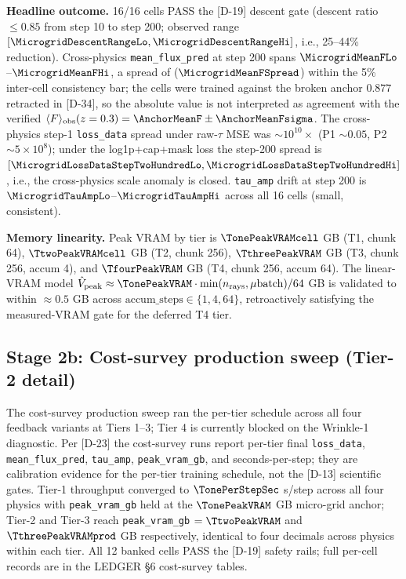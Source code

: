 \textbf{Headline outcome.} 16/16 cells PASS the [D-19] descent gate (descent ratio $\leq 0.85$ from step 10 to step 200; observed range $[\MicrogridDescentRangeLo, \MicrogridDescentRangeHi]$, i.e., 25--44\% reduction). Cross-physics \texttt{mean\_flux\_pred} at step 200 spans $\MicrogridMeanFLo$--$\MicrogridMeanFHi$, a spread of \textbf{\MicrogridMeanFSpreadAbs} ($\MicrogridMeanFSpread$) within the 5\% inter-cell consistency bar; the cells were trained against the broken anchor $0.877$ retracted in [D-34], so the absolute value is not interpreted as agreement with the verified $\langle F\rangle_{\text{obs}}(z=0.3) = \AnchorMeanF \pm \AnchorMeanFsigma$. The cross-physics step-1 \texttt{loss\_data} spread under raw-$\tau$ MSE was $\sim 10^{10} \times$ (P1 $\sim 0.05$, P2 $\sim 5 \times 10^{8}$); under the log1p+cap+mask loss the step-200 spread is $[\MicrogridLossDataStepTwoHundredLo, \MicrogridLossDataStepTwoHundredHi]$, i.e., the cross-physics scale anomaly is closed. \texttt{tau\_amp} drift at step 200 is $\MicrogridTauAmpLo$--$\MicrogridTauAmpHi$ across all 16 cells (small, consistent).

\textbf{Memory linearity.} Peak VRAM by tier is $\TonePeakVRAMcell$ GB (T1, chunk 64), $\TtwoPeakVRAMcell$ GB (T2, chunk 256), $\TthreePeakVRAM$ GB (T3, chunk 256, accum 4), and $\TfourPeakVRAM$ GB (T4, chunk 256, accum 64). The linear-VRAM model $\hat{V}_{\text{peak}} \approx \TonePeakVRAM \cdot \min(n_{\text{rays}}, \mu\text{batch}) / 64$ GB is validated to within $\approx 0.5$ GB across $\text{accum\_steps} \in \{1, 4, 64\}$, retroactively satisfying the measured-VRAM gate for the deferred T4 tier.

\subsection{Stage 2b: Cost-survey production sweep (Tier-2 detail)}
\label{sec:suppl:exp:cost-survey-sweep}
The cost-survey production sweep ran the per-tier schedule across all four feedback variants at Tiers 1--3; Tier 4 is currently blocked on the Wrinkle-1 diagnostic. Per [D-23] the cost-survey runs report per-tier final \texttt{loss\_data}, \texttt{mean\_flux\_pred}, \texttt{tau\_amp}, \texttt{peak\_vram\_gb}, and seconds-per-step; they are calibration evidence for the per-tier training schedule, not the [D-13] scientific gates. Tier-1 throughput converged to $\TonePerStepSec$ s/step across all four physics with \texttt{peak\_vram\_gb} held at the $\TonePeakVRAM$ GB micro-grid anchor; Tier-2 and Tier-3 reach \texttt{peak\_vram\_gb} $= \TtwoPeakVRAM$ and $\TthreePeakVRAMprod$ GB respectively, identical to four decimals across physics within each tier. All 12 banked cells PASS the [D-19] safety rails; full per-cell records are in the LEDGER \S6 cost-survey tables.

